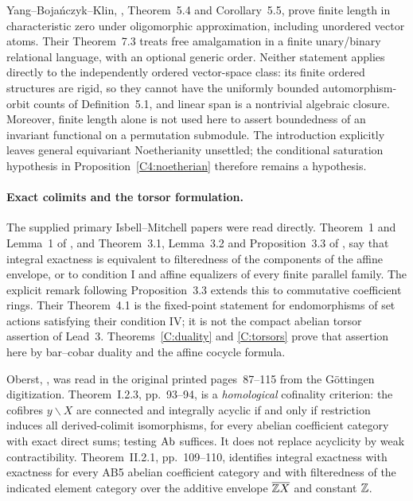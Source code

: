 Yang--Boja\'nczyk--Klin, \cite{ABYangBojanczykKlin2026},
Theorem~5.4 and Corollary~5.5, prove finite length in characteristic
zero under oligomorphic approximation, including unordered vector
atoms. Their Theorem~7.3 treats free amalgamation in a finite
unary/binary relational language, with an optional generic order.
Neither statement applies directly to the independently ordered
vector-space class: its finite ordered structures are rigid, so
they cannot have the uniformly bounded automorphism-orbit counts
of Definition~5.1, and linear span is a nontrivial algebraic closure.
Moreover, finite length alone is not used here to assert boundedness
of an invariant functional on a permutation submodule. The
introduction explicitly leaves general equivariant Noetherianity
unsettled; the conditional saturation hypothesis in
Proposition~\ref{C4:noetherian} therefore remains a hypothesis.

\paragraph{Exact colimits and the torsor formulation.}
The supplied primary Isbell--Mitchell papers were read directly.
Theorem~1 and Lemma~1 of \cite{ABIsbellMitchell1973}, and
Theorem~3.1, Lemma~3.2 and Proposition~3.3 of
\cite{IsbellMitchell1976}, say that integral exactness is equivalent
to filteredness of the components of the affine envelope, or to
condition I and affine equalizers of every finite parallel family.
The explicit remark following Proposition~3.3 extends this to
commutative coefficient rings. Their Theorem~4.1 is the fixed-point
statement for endomorphisms of set actions satisfying their
condition IV; it is not the compact abelian torsor assertion of
Lead~3. Theorems~\ref{C:duality} and \ref{C:torsors} prove that
assertion here by bar--cobar duality and the affine cocycle formula.

Oberst, \cite{ABOberst1968}, was read in the original printed
pages~87--115 from the G\"ottingen digitization. Theorem~I.2.3,
pp.~93--94, is a \emph{homological} cofinality criterion: the
cofibres $y\backslash X$ are connected and integrally acyclic if
and only if restriction induces all derived-colimit isomorphisms,
for every abelian coefficient category with exact direct sums;
testing $\mathrm{Ab}$ suffices. It does not replace acyclicity by weak
contractibility. Theorem~II.2.1, pp.~109--110, identifies integral
exactness with exactness for every AB5 abelian coefficient category
and with filteredness of the indicated element category over the
additive envelope $\overline{\mathbb Z X}$ and constant $\mathbb Z$.

